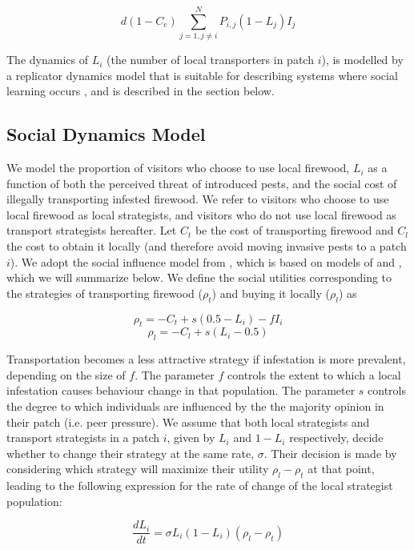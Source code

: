 $$d (1 - C_e) \sum_{j = 1, j\neq i}^N P_{i,j}(1 - L_j)I_j$$
 
The dynamics of $L_i$ (the number of local transporters in patch $i$), is modelled by a replicator dynamics model that is suitable for describing systems where social learning occurs \cite{bauch2005imitation,hofbauer1998evolutionary}, and is described in the section below. 

\subsection{Social Dynamics Model}

We model the proportion of visitors who choose to use local firewood, $L_i$ as a function of both the perceived threat of introduced pests, and the social cost of illegally transporting infested firewood. We refer to visitors who choose to use local firewood as local strategists, and visitors who do not use local firewood as transport strategists hereafter. Let $C_t$ be the cost of transporting firewood and $C_l$ the cost to obtain it locally (and therefore avoid moving invasive pests to a patch $i$). We adopt the social influence model from \cite{barlow2014modelling}, which is based on models of \cite{bauch2005imitation} and \cite{ hofbauer1998evolutionary}, which we will summarize below.
We define the social utilities corresponding to the strategies of transporting firewood ($\rho_t$) and buying it locally ($\rho_l$) as 

$$\rho_t  = - C_t + s(0.5 - L_i) - f I_i$$
$$\rho_l = - C_l + s(L_i - 0.5)$$

Transportation becomes a less attractive strategy if infestation is more prevalent, depending on the size of $f$. The parameter $f$ controls the extent to which a local infestation causes behaviour change in that population. The parameter $s$ controls the degree to which individuals are influenced by the the majority opinion in their patch (i.e. peer pressure). We assume that both local strategists and transport strategists in a patch $i$, given by $L_i$ and $1 - L_i$ respectively, decide whether to change their strategy at the same rate, $\sigma$. Their decision is made by considering which strategy will maximize their utility $\rho_l - \rho_t$ at that point, leading to the following expression for the rate of change of the local strategist population:

$$\frac{d L_i}{dt} = \sigma L_i (1 - L_i) (\rho_l - \rho_t)$$


